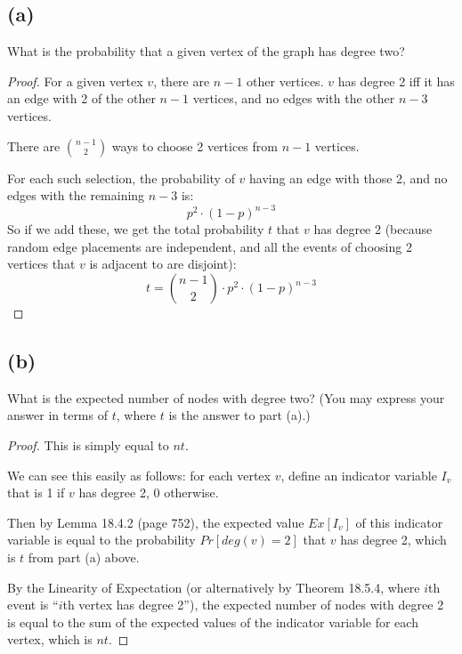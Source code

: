 \documentclass[14pt]{extarticle}
\begin{document}
\subsection{(a)}
What is the probability that a given vertex of the graph has degree two?
\begin{proof}
For a given vertex $v$, there are $n-1$ other vertices. $v$ has degree 2 iff it has an edge with 2 of the other $n-1$ vertices, and no edges with the other $n-3$ vertices.

There are $\displaystyle \binom{n-1}{2}$ ways to choose 2 vertices from $n-1$ vertices.

For each such selection, the probability of $v$ having an edge with those 2, and no edges with the remaining $n-3$ is:
$$
p^2 \cdot (1-p)^{n-3}
$$
So if we add these, we get the total probability $t$ that $v$ has degree 2 (because random edge placements are independent, and all the events of choosing 2 vertices that $v$ is adjacent to are disjoint):
$$
t = \binom{n-1}{2} \cdot p^2 \cdot (1-p)^{n-3}
$$
\end{proof}

\subsection{(b)}
What is the expected number of nodes with degree two? (You may express your answer in terms of $t$, where $t$ is the answer to part (a).)
\begin{proof}
This is simply equal to $nt$. 

We can see this easily as follows: for each vertex $v$, define an indicator variable $I_v$ that is 1 if $v$ has degree 2, 0 otherwise. 

Then by Lemma 18.4.2 (page 752), the expected value $Ex[I_v]$ of this indicator variable is equal to the probability $Pr[deg(v)=2]$ that $v$ has degree 2, which is $t$ from part (a) above.

By the Linearity of Expectation (or alternatively by Theorem 18.5.4, where $i$th event is ``$i$th vertex has degree 2''), the expected number of nodes with degree 2 is equal to the sum of the expected values of the indicator variable for each vertex, which is $nt$.
\end{proof}
\end{document}
